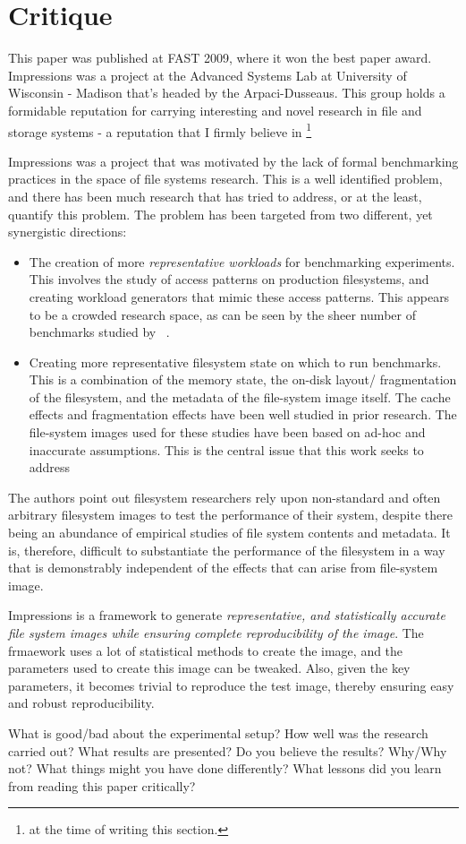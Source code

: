 \section{Critique}
This paper was published at FAST 2009, where it won the best paper award. Impressions was a project at the Advanced Systems Lab at University of Wisconsin - Madison that's headed by the Arpaci-Dusseaus. This group holds a formidable reputation for carrying interesting and novel research in file and storage systems - a reputation that I firmly believe in \footnote{at the time of writing this section.}

Impressions was a project that was motivated by the lack of formal benchmarking practices in the space of file systems research. This is a well identified problem, and there has been much research that has tried to address, or at the least, quantify this problem. The problem has been targeted from two different, yet synergistic directions:
\begin{itemize}
\item The creation of more \emph{representative workloads} for benchmarking experiments. This involves the study of access patterns on production filesystems, and creating workload generators that mimic these access patterns. This appears to be a crowded research space, as can be seen by the sheer number of benchmarks studied by ~\cite{tarasov2011benchmarking}.
\item Creating more representative filesystem state on which to run benchmarks. This is a combination of the memory state, the on-disk layout/ fragmentation of the filesystem, and the metadata of the file-system image itself. The cache effects and fragmentation effects have been well studied in prior research. The file-system images used for these studies have been based on ad-hoc and inaccurate assumptions. This is the central issue that this work seeks to address
\end{itemize}

The authors point out filesystem researchers rely upon non-standard and often arbitrary filesystem images to test the performance of their system, despite there being an abundance of empirical studies of file system contents and metadata. It is, therefore, difficult to substantiate the performance of the filesystem in a way that is demonstrably independent of the effects that can arise from file-system image.

Impressions is a framework to generate \emph{representative, and statistically accurate file system images while ensuring complete reproducibility of the image}. The frmaework uses a lot of statistical methods to create the image, and the parameters used to create this image can be tweaked. Also, given the key parameters, it becomes trivial to reproduce the test image, thereby ensuring easy and robust reproducibility.


What is good/bad about the experimental setup?
How well was the research carried out? What results are presented?
Do you believe the results? Why/Why not?
What things might you have done differently?
What lessons did you learn from reading this paper critically? 